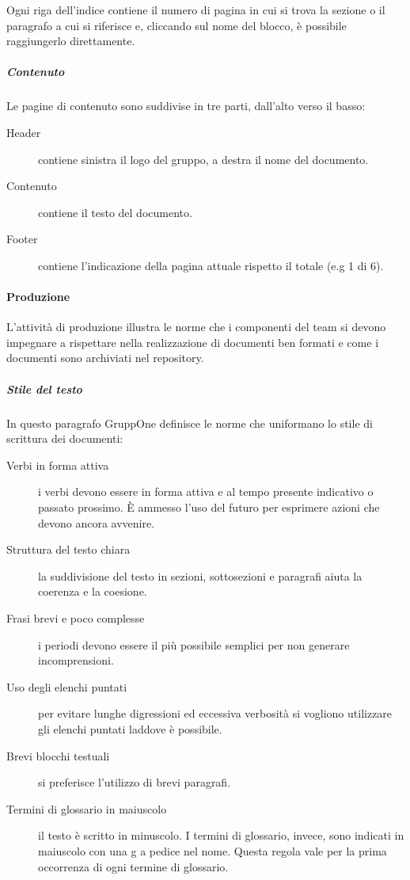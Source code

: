 \documentclass[../../norme-di-progetto.tex]{subfiles}
\begin{document}
Ogni riga dell'indice contiene il numero di pagina in cui si trova la sezione o il paragrafo a cui si riferisce e, cliccando sul nome del blocco, è possibile raggiungerlo direttamente.

\subparagraph{Contenuto}%
\label{subp:contenuto}
Le pagine di contenuto sono suddivise in tre parti, dall'alto verso il basso:
\begin{description}
  \item [Header] contiene sinistra il logo del gruppo, a destra il nome del documento.
  \item [Contenuto] contiene il testo del documento.
  \item [Footer] contiene l'indicazione della pagina attuale rispetto il totale (e.g 1 di 6).
\end{description}


\paragraph{Produzione}%
\label{par:produzione}

L'attività di produzione illustra le norme che i componenti del team si devono impegnare a rispettare nella realizzazione di documenti ben formati e come i documenti sono archiviati nel repository.


\subparagraph{Stile del testo}%
\label{subp:stile_del_testo}
In questo paragrafo GruppOne definisce le norme che uniformano lo stile di scrittura dei documenti:
\begin{description}
  \item [Verbi in forma attiva] i verbi devono essere in forma attiva e al tempo presente indicativo o passato prossimo. È ammesso l'uso del futuro per esprimere azioni che devono ancora avvenire.
  \item [Struttura del testo chiara] la suddivisione del testo in sezioni, sottosezioni e paragrafi aiuta la coerenza e la coesione.
  \item [Frasi brevi e poco complesse] i periodi devono essere il più possibile semplici per non generare incomprensioni.
  \item [Uso degli elenchi puntati] per evitare lunghe digressioni ed eccessiva verbosità si vogliono utilizzare gli elenchi puntati laddove è possibile.
  \item [Brevi blocchi testuali] si preferisce l'utilizzo di brevi paragrafi.
  \item [Termini di glossario in maiuscolo] il testo è scritto in minuscolo. I termini di glossario, invece, sono indicati in maiuscolo con una g a pedice nel nome. Questa regola vale per la prima occorrenza di ogni termine di glossario.
\end{description}
\end{document}
